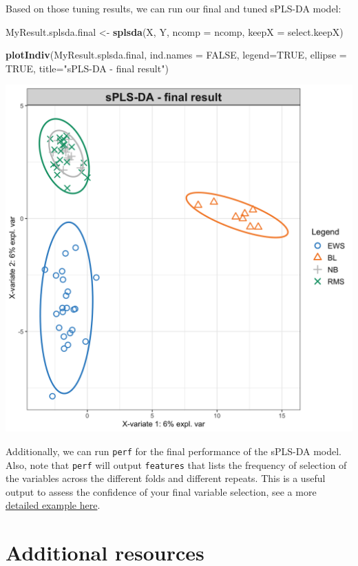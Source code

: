 \documentclass[]{book}
\newenvironment{Shaded}{\begin{snugshade}}{\end{snugshade}}
\newcommand{\DataTypeTok}[1]{\textcolor[rgb]{0.13,0.29,0.53}{#1}}
\newcommand{\KeywordTok}[1]{\textcolor[rgb]{0.13,0.29,0.53}{\textbf{#1}}}
\newcommand{\NormalTok}[1]{#1}
\newcommand{\OtherTok}[1]{\textcolor[rgb]{0.56,0.35,0.01}{#1}}
\newcommand{\StringTok}[1]{\textcolor[rgb]{0.31,0.60,0.02}{#1}}
\begin{document}
Based on those tuning results, we can run our final and tuned sPLS-DA model:

\begin{Shaded}
\begin{Highlighting}[]
\NormalTok{MyResult.splsda.final <-}\StringTok{ }\KeywordTok{splsda}\NormalTok{(X, Y, }\DataTypeTok{ncomp =}\NormalTok{ ncomp, }\DataTypeTok{keepX =}\NormalTok{ select.keepX)}

\KeywordTok{plotIndiv}\NormalTok{(MyResult.splsda.final, }\DataTypeTok{ind.names =} \OtherTok{FALSE}\NormalTok{, }\DataTypeTok{legend=}\OtherTok{TRUE}\NormalTok{,}
          \DataTypeTok{ellipse =} \OtherTok{TRUE}\NormalTok{, }\DataTypeTok{title=}\StringTok{"sPLS-DA - final result"}\NormalTok{)}
\end{Highlighting}
\end{Shaded}

\begin{center}\includegraphics[width=0.75\linewidth,]{Figures/04-final-splsda-1} \end{center}

Additionally, we can run \texttt{perf} for the final performance of the sPLS-DA model. Also, note that \texttt{perf} will output \texttt{features} that lists the frequency of selection of the variables across the different folds and different repeats. This is a useful output to assess the confidence of your final variable selection, see a more \href{http://mixomics.org/case-studies/splsda-srbct/}{detailed example here}.

\hypertarget{additional-resources-1}{%
\section{Additional resources}\label{additional-resources-1}}
\end{document}
